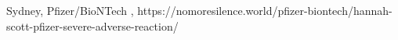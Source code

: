           {Sydney, }
          {}
          {Pfizer/BioNTech}
          {}
          {
            ,
          }
          {https://nomoresilence.world/pfizer-biontech/hannah-scott-pfizer-severe-adverse-reaction/}

